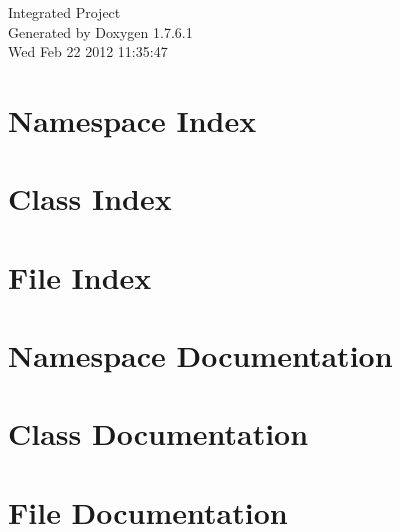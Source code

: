 \documentclass[a4paper]{book}
\begin{document}
\hypersetup{pageanchor=false,citecolor=blue}
\begin{titlepage}
\vspace*{7cm}
\begin{center}
{\Large \-Integrated \-Project }\\
\vspace*{1cm}
{\large \-Generated by Doxygen 1.7.6.1}\\
\vspace*{0.5cm}
{\small Wed Feb 22 2012 11:35:47}\\
\end{center}
\end{titlepage}
\clearemptydoublepage
{}
\tableofcontents
\clearemptydoublepage
{}
\hypersetup{pageanchor=true,citecolor=blue}
\chapter{\-Namespace \-Index}

\chapter{\-Class \-Index}

\chapter{\-File \-Index}

\chapter{\-Namespace \-Documentation}




\chapter{\-Class \-Documentation}







\chapter{\-File \-Documentation}
















\printindex
\end{document}
